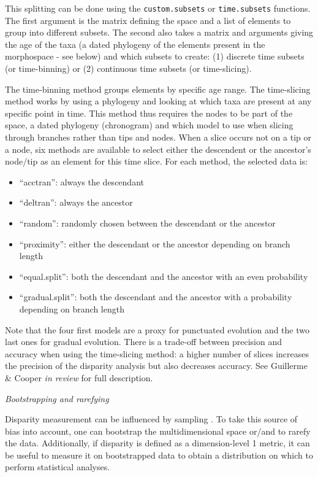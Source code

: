 \documentclass[12pt,letterpaper]{article}
\renewcommand{\subsection}[1]{%
\bigskip
\begin{center}
\begin{large}
\normalfont\itshape #1
\end{large}
\end{center}}
\begin{document}
This splitting can be done using the \texttt{custom.subsets} or \texttt{time.subsets} functions.
The first argument is the matrix defining the space and a list of elements to group into different subsets.
The second also takes a matrix and arguments giving the age of the taxa (a dated phylogeny of the elements present in the morphospace - see below) and which subsets to create: (1) discrete time subsets (or time-binning) or (2) continuous time subsets (or time-slicing).

The time-binning method groups elements by specific age range.
The time-slicing method works by using a phylogeny and looking at which taxa are present at any specific point in time.
This method thus requires the nodes to be part of the space, a dated phylogeny (chronogram) and which model to use when slicing through branches rather than tips and nodes.
When a slice occurs not on a tip or a node, six methods are available to select either the descendent or the ancestor's node/tip as an element for this time slice.
For each method, the selected data is:

\begin{itemize}
    \item ``acctran'': always the descendant
    \item ``deltran'': always the ancestor
    \item ``random'': randomly chosen between the descendant or the ancestor
    \item ``proximity'': either the descendant or the ancestor depending on branch length
    \item ``equal.split'': both the descendant and the ancestor with an even probability
    \item ``gradual.split'': both the descendant and the ancestor with a probability depending on branch length
\end{itemize}

Note that the four first models are a proxy for punctuated evolution and the two last ones for gradual evolution.
There is a trade-off between precision and accuracy when using the time-slicing method: a higher number of slices increases the precision of the disparity analysis but also decreases accuracy.
See Guillerme \& Cooper \textit{in review} for full description.

\subsection{Bootstrapping and rarefying}
Disparity measurement can be influenced by sampling \citep{Butler2012}.
To take this source of bias into account, one can bootstrap the multidimensional space or/and to rarefy the data.
Additionally, if disparity is defined as a dimension-level 1 metric, it can be useful to measure it on bootstrapped data to obtain a distribution on which to perform statistical analyses.
\end{document}
